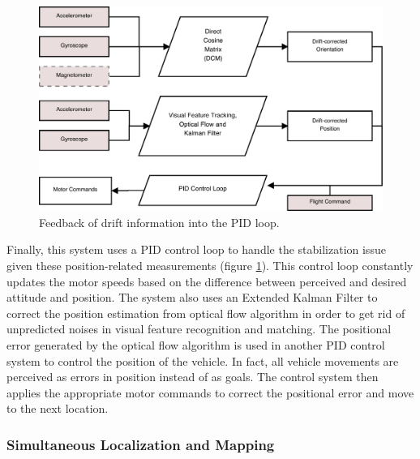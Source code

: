 \documentclass[12pt, letterpaper]{article}
\begin{document}
\begin{figure}[h]
\centering
\includegraphics[width=12cm]{images/PID.pdf}
\caption{Feedback of drift information into the PID loop.} 
\label{fig:PID}
\end{figure}
\noindent
Finally, this system uses a PID control loop to handle the stabilization issue given these position-related measurements (figure \ref{fig:PID}). This control loop constantly updates the motor speeds based on the difference between perceived and desired attitude and position. The system also uses an Extended Kalman Filter to correct the position estimation from optical flow algorithm in order to get rid of unpredicted noises in visual feature recognition and matching. The positional error generated by the optical flow algorithm is used in another PID control system to control the position of the vehicle. In fact, all vehicle movements are perceived as errors in position instead of as goals. The control system then applies the appropriate motor commands to correct the positional error and move to the next location.

\subsubsection{Simultaneous Localization and Mapping}
\end{document}
